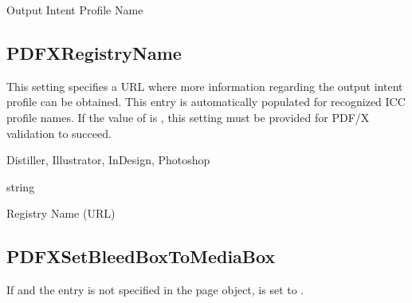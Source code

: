 \documentclass[letterpaper,12pt,english,openany,oneside]{sphinxmanual}
\begin{document}
\label{\detokenize{PDF_Create_CommonSettings:ui-name-97}}

Output Intent Profile Name

\label{\detokenize{PDF_Create_CommonSettings:default-value-110}}

\begin{sphinxVerbatim}[commandchars=\\\{\}]
\end{sphinxVerbatim}




\subsection{PDFXRegistryName}
\label{\detokenize{PDF_Create_CommonSettings:pdfxregistryname}}
This setting specifies a URL where more information regarding the output intent profile can be obtained. This entry is automatically populated for recognized ICC profile names. If the value of  is  , this setting must be provided for PDF/X validation to succeed.

\label{\detokenize{PDF_Create_CommonSettings:supported-by-117}}

Distiller, Illustrator, InDesign, Photoshop

\label{\detokenize{PDF_Create_CommonSettings:type-116}}

string

\label{\detokenize{PDF_Create_CommonSettings:ui-name-98}}

Registry Name (URL)

\label{\detokenize{PDF_Create_CommonSettings:default-value-111}}

\begin{sphinxVerbatim}[commandchars=\\\{\}]
\end{sphinxVerbatim}




\subsection{PDFXSetBleedBoxToMediaBox}
\label{\detokenize{PDF_Create_CommonSettings:pdfxsetbleedboxtomediabox}}
If  and the  entry is not specified in the page object,  is set to  .
\end{document}
